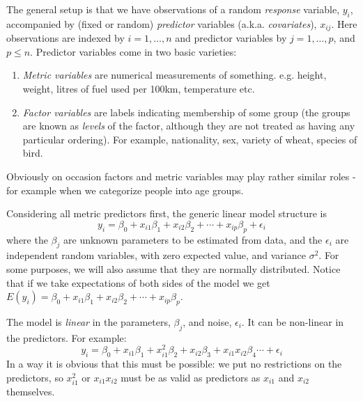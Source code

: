 \documentclass[10pt] {article}
\theoremstyle{definition}
\begin{document}
The general setup is that we have observations of a random {\em response} variable, $y_i$, accompanied by (fixed or random) {\em predictor} variables (a.k.a. {\em covariates}), $x_{ij}$. Here observations are indexed by $i = 1,\ldots,n $ and predictor variables by $j=1, \ldots, p$, and $p \le n$. Predictor variables come in two basic varieties:
\begin{enumerate}
\item {\em Metric variables} are numerical measurements of something. e.g. height, weight, litres of fuel used per 100km, temperature etc. 
\item {\em Factor variables} are labels indicating membership of some group (the groups are known as {\em levels} of the factor, although they are not treated as having any particular ordering). For example, nationality, sex, variety of wheat, species of bird.   
\end{enumerate}  
Obviously on occasion factors and metric variables may play rather similar roles - for example when we categorize people into age groups.

Considering all metric predictors first, the generic linear model structure is 
$$
y_i = \beta_0 + x_{i1} \beta_1 + x_{i2} \beta_2 + \cdots + x_{ip} \beta_p + \epsilon_i 
$$
where the $\beta_j$ are unknown parameters to be estimated from data, and the $\epsilon_i$ are independent random variables, with zero expected value, and variance $\sigma^2$. For some purposes, we will also assume that they are normally distributed. Notice that if we take expectations of both sides of the model we get $E(y_i) =  \beta_0 + x_{i1} \beta_1 + x_{i2} \beta_2 + \cdots + x_{ip}\beta_p $. 

The model is {\em linear} in the parameters, $\beta_j$, and noise, $\epsilon_i$. It can be non-linear in the predictors. For example:
$$
y_i = \beta_0 + x_{i1} \beta_1 + x_{i1}^2 \beta_2 + x_{i2} \beta_3 + x_{i1} x_{i2} \beta_4 \cdots + \epsilon_i 
$$
In a way it is obvious that this must be possible: we put no restrictions on the predictors, so $x_{i1}^2$ or $x_{i1} x_{i2}$ must be as valid as predictors as $x_{i1}$ and $x_{i2}$ themselves.  
\end{document}
